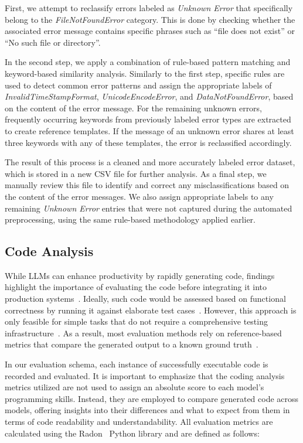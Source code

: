 \documentclass{DESSThesis}
\begin{document}
First, we attempt to reclassify errors labeled as \emph{Unknown Error} that specifically belong to the \emph{FileNotFoundError} category. This is done by checking whether the associated error message contains specific phrases such as \enquote{file does not exist} or \enquote{No such file or directory}.

In the second step, we apply a combination of rule-based pattern matching and keyword-based similarity analysis. Similarly to the first step, specific rules are used to detect common error patterns and assign the appropriate labels of \emph{InvalidTimeStampFormat}, \emph{UnicodeEncodeError}, and \emph{DataNotFoundError}, based on the content of the error message. For the remaining unknown errors, frequently occurring keywords from previously labeled error types are extracted to create reference templates. If the message of an unknown error shares at least three keywords with any of these templates, the error is reclassified accordingly.

The result of this process is a cleaned and more accurately labeled error dataset, which is stored in a new CSV file for further analysis. As a final step, we manually review this file to identify and correct any misclassifications based on the content of the error messages. We also assign appropriate labels to any remaining \emph{Unknown Error} entries that were not captured during the automated preprocessing, using the same rule-based methodology applied earlier.

\subsection{Code Analysis}

While LLMs can enhance productivity by rapidly generating code, findings highlight the importance of evaluating the code before integrating it into production systems~\cite{licorish2025comparinghumanllmgenerated}. Ideally, such code would be assessed based on functional correctness by running it against elaborate test cases~\cite{farchi2024automaticgenerationbenchmarksreliable}. However, this approach is only feasible for simple tasks that do not require a comprehensive testing infrastructure~\cite{farchi2024automaticgenerationbenchmarksreliable}. As a result, most evaluation methods rely on reference-based metrics that compare the generated output to a known ground truth~\cite{farchi2024automaticgenerationbenchmarksreliable}.

In our evaluation schema, each instance of successfully executable code is recorded and evaluated. It is important to emphasize that the coding analysis metrics utilized are not used to assign an absolute score to each model's programming skills. Instead, they are employed to compare generated code across models, offering insights into their differences and what to expect from them in terms of code readability and understandability. All evaluation metrics are calculated using the Radon~\cite{radon} Python library and are defined as follows:
\end{document}
